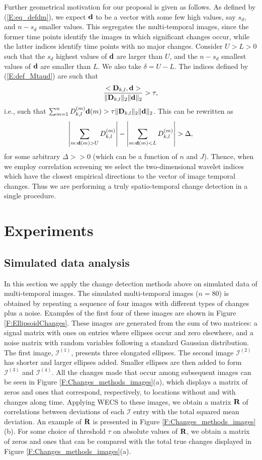 \documentclass[journal]{IEEEtran}
\newcommand{\vD}{{\textbf D}}
\newcommand{\vd}{{\textbf d}}
\newcommand{\vR}{{\textbf R}}
\begin{document}
Further geometrical motivation for our proposal is given as follows. As defined by (\ref{E:eq_defdm}), we expect $\vd$ to be a vector with some few high values, say $s_d$, and $n-s_d$ smaller values. This segregates the multi-temporal images, since the former time points identify the images in which significant changes occur, while the latter indices identify time points with no major changes. Consider $U>L>0$ such that the $s_d$ highest values of $\vd$ are larger than $U$, and the $n-s_d$ smallest values of $\vd$ are smaller than $L$. We also take $\delta=U-L$. The indices defined by  (\ref{E:def_Mtaud}) are such that   
\[
\frac{<\vD_{k,l},\vd>}{\|\vD_{k,l}\|_2\|\vd\|_2}>\tau,
\]
i.e., such that  $\sum_{m=1}^nD_{k,l}^{(m)}\vd(m)>\tau\|\vD_{k,l}\|_2\|\vd\|_2$. This can be rewritten as
\[
\left|\sum_{m:\vd(m)>U} D_{k,l}^{(m)}\right|-\left|\sum_{m:\vd(m)<L} D_{k,l}^{(m)}\right|>\Delta,
\]
for some arbitrary $\Delta>>0$ (which can be a function of $n$ and $J$). Thence, when we employ correlation screening we select the two-dimensional wavelet indices which have the closest empirical directions to the vector of image temporal changes. Thus we are performing a truly spatio-temporal change detection in a single procedure.



\section{Experiments}

\subsection{Simulated data analysis}\label{secExpSimulated}

In this section we apply the change detection methods above on simulated data of multi-temporal images. The simulated multi-temporal images ($n=80$) is obtained by repeating a sequence of four images with different types of changes plus a noise. Examples of the first four of these images are shown in Figure \ref{F:EllipsoidChanges}. These images are generated from the sum of two matrices: a signal matrix with ones on entries where ellipses occur and zero elsewhere, and a noise matrix with random variables following a standard Gaussian distribution. The first image, $\mathcal{I}^{(1)}$, presents three elongated ellipses. The second image $\mathcal{I}^{(2)}$ has shorter and larger ellipses added. Smaller ellipses are then added to form $\mathcal{I}^{(3)}$ and $\mathcal{I}^{(4)}$. All the changes made that occur among subsequent images can be seen in Figure \ref{F:Changes_methods_images}(a), which displays a matrix of zeros and ones that correspond, respectively, to locations without and with changes along time. Applying WECS to these images, we obtain a matrix $\vR$ of correlations between deviations of each $\mathcal{I}$ entry with the total squared mean deviation. An example of $\vR$ is presented in Figure \ref{F:Changes_methods_images}(b). For some choice of threshold $\tau$ on absolute values of $\vR$, we obtain a matrix of zeros and ones that can be compared with the total true changes displayed in Figure \ref{F:Changes_methods_images}(a).
\end{document}
